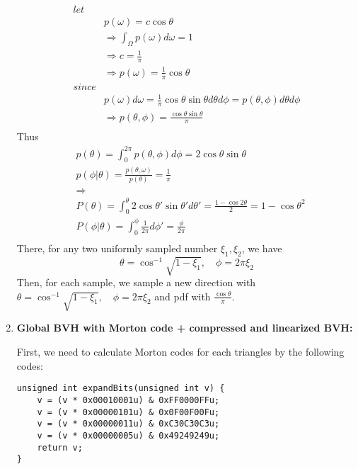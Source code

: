 \documentclass[acmtog]{acmart}
\begin{document}
\begin{enumerate}
	\begin{align*}
		let& \\ 
		&p(\omega)=c\cos\theta\\
		&\Rightarrow \int_{\Omega}p(\omega)d\omega = 1\\
		&\Rightarrow c=\frac{1}{\pi}\\
		&\Rightarrow p(\omega)=\frac{1}{\pi}\cos\theta\\
		since& \\ 
		&p(\omega)d\omega=\frac{1}{\pi}\cos\theta\sin\theta d\theta d\phi = p(\theta,\phi)d\theta d\phi\\
		&\Rightarrow p(\theta,\phi)=\frac{\cos\theta\sin\theta}{\pi}\\
	\end{align*}
	Thus
	\begin{align*}
		&p(\theta) = \int_{0}^{2\pi}p(\theta,\phi)d\phi=2\cos\theta\sin\theta\\
		&p(\phi |\theta)=\frac{p(\theta,\omega)}{p(\theta)}=\frac{1}{\pi}\\
		&\Rightarrow\\
		&P(\theta)=\int_{0}^\theta 2\cos\theta'\sin\theta'd\theta'=\frac{1-\cos 2\theta}{2}=1-\cos\theta^2\\
		&P(\phi |\theta)=\int_0^\phi\frac{1}{2\pi}d\phi'=\frac{\phi}{2\pi}\\
	\end{align*}
	There, for any two uniformly sampled number $\xi_1,\xi_2$, we have 
	\[\theta=\cos^{-1}\sqrt{1-\xi_1},\quad\phi=2\pi\xi_2\]
	Then, for each sample, we sample a new direction with $\theta=\cos^{-1}\sqrt{1-\xi_1},\quad\phi=2\pi\xi_2$ and pdf with $\frac{\cos\theta}{\pi}$.
	\item {\bf Global BVH with Morton code + compressed and linearized BVH:}
	\par First, we need to calculate Morton codes for each triangles by the following codes:
	\begin{lstlisting}
unsigned int expandBits(unsigned int v) {
	v = (v * 0x00010001u) & 0xFF0000FFu;
	v = (v * 0x00000101u) & 0x0F00F00Fu;
	v = (v * 0x00000011u) & 0xC30C30C3u;
	v = (v * 0x00000005u) & 0x49249249u;
	return v;
}


\end{lstlisting}
\end{enumerate}
\end{document}
